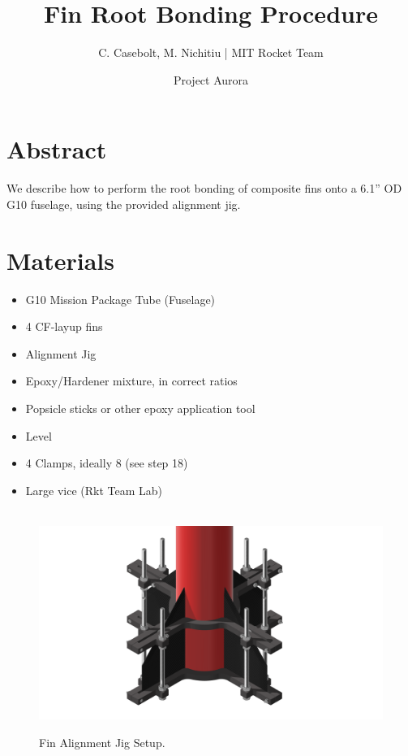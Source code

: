 \documentclass{amsdtx}
\title{\sc Fin Root Bonding Procedure}
\author{\sc C. Casebolt, M. Nichitiu | MIT Rocket Team}
\date{\sc Project Aurora}
\begin{document}
\maketitle    
\section{Abstract}
We describe how to perform the root bonding of composite fins onto a 6.1'' OD G10 fuselage, using the provided alignment jig.
\section{Materials}
\begin{itemize}
	\item G10 Mission Package Tube (Fuselage)
	\item 4 CF-layup fins
	\item Alignment Jig
	\item Epoxy/Hardener mixture, in correct ratios
	\item Popsicle sticks or other epoxy application tool
	\item Level
	\item 4 Clamps, ideally 8 (see step 18)
	\item Large vice (Rkt Team Lab)
\end{itemize}
\begin{figure}[H]
\centering
~\kern-0.5cm\includegraphics[scale=0.3]{render.png}
\caption{Fin Alignment Jig Setup.}	
\end{figure}
\end{document}
